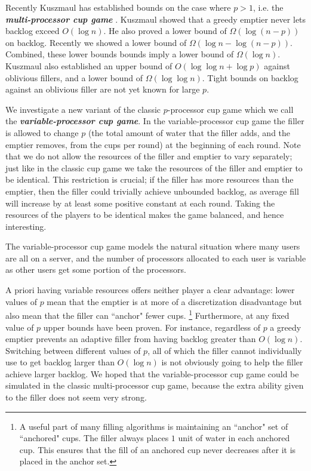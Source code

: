 \documentclass[twocolumn]{article}[10pt]
\newcommand{\defn}[1]{{\textit{\textbf{\boldmath #1}}}\xspace}
\renewcommand{\paragraph}[1]{\vspace{0.09in}\noindent{\bf \boldmath #1.}}
\begin{document}
Recently Kuszmaul has established bounds on the case where $p>1$, i.e. the
\defn{multi-processor cup game} \cite{wku20}. Kuszmaul showed that a greedy
emptier never lets backlog exceed $O(\log n)$. He also proved a lower bound of
$\Omega(\log (n-p))$ on backlog. Recently we showed a lower bound of
$\Omega(\log n - \log (n-p))$. Combined, these lower bounds bounds imply a
lower bound of $\Omega(\log n)$. Kuszmaul also established an upper bound of
$O(\log\log n + \log p)$ against oblivious fillers, and a lower bound of
$\Omega(\log\log n)$. Tight bounds on backlog against an oblivious
filler are not yet known for large $p$.

\paragraph{The Variable-Processor Cup Game}
We investigate a new variant of the classic $p$-processor cup game which we call
the \defn{variable-processor cup game}. In the variable-processor cup game the
filler is allowed to change $p$ (the total amount of water that the filler
adds, and the emptier removes, from the cups per round) at the beginning of
each round. Note that we do not allow the resources of the filler and emptier
to vary separately; just like in the classic cup game we take the resources of
the filler and emptier to be identical.
This restriction is crucial; if
the filler has more resources than the emptier, then
the filler could trivially achieve unbounded backlog, as average fill will
increase by at least some positive constant at each round.
Taking the resources of the players to be identical makes the game balanced,
and hence interesting.

The variable-processor cup game models the natural situation
where many users are all on a server, and the number of
processors allocated to each user is variable as other users get
some portion of the processors.

A priori having variable resources offers neither player a clear advantage:
lower values of $p$ mean that the emptier is at more of a discretization
disadvantage but also mean that the filler can ``anchor" fewer   
cups. \footnote{A
useful part of many filling algorithms is maintaining an ``anchor" set of
``anchored" cups. The filler always places $1$ unit of water in each anchored
cup. This ensures that the fill of an anchored cup never decreases after it is
placed in the anchor set.} Furthermore, at any fixed value of $p$ upper bounds
have been proven. For instance, regardless of $p$ a greedy emptier prevents an
adaptive filler from having backlog greater than $O(\log n)$. Switching between
different values of $p$, all of which the filler cannot individually use to get
backlog larger than $O(\log n)$ is not obviously going to help
the filler achieve larger backlog. We hoped that the
variable-processor cup game could be simulated in the classic
multi-processor cup game, because the extra ability given to the
filler does not seem very strong. 
\end{document}
